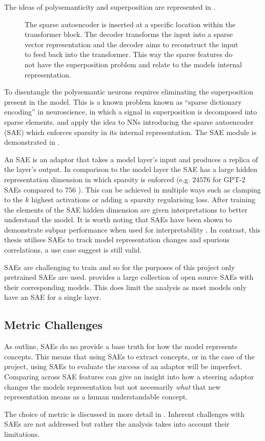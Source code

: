 The ideas of polysemanticity and superposition are represented in .

\begin{figure}
    \centering
    \captionsetup{width=.9\textwidth}
    
    \caption{The sparse autoencoder is inserted at a specific location within the transformer block. The decoder transforms the input into a sparse vector representation and the decoder aims to reconstruct the input to feed back into the transformer. This way the sparse features do not have the superposition problem and relate to the models internal representation.}
    \label{fig:sae}
\end{figure}

To disentangle the polysemantic neurons requires eliminating the superposition present in the model.
This is a known problem known as ``sparse dictionary encoding'' \citep{sparse-coding} in neuroscience, in which a signal in superposition is decomposed into sparse elements.
\citet{sae-orig} and \citet{saes} apply the idea to NNs introducing the sparse autoencoder (SAE) which enforces sparsity in its internal representation.
The SAE module is demonstrated in .

An SAE is an adaptor that takes a model layer's input and produces a replica of the layer's output.
In comparison to the model layer the SAE has a large hidden representation dimension in which sparsity is enforced (e.g. $24576$ for GPT-2 SAEs compared to $756$ \citep{saelens}).
This can be achieved in multiple ways such as clamping to the $k$ highest activations \citep{k-sparsity} or adding a sparsity regularising loss.
After training the elements of the SAE hidden dimension are given interpretations to better understand the model.
It is worth noting that SAEs have been shown to demonstrate subpar performance when used for interpretability \citep{saes-bad}.
In contrast, this thesis utilises SAEs to track model representation changes and spurious correlations, a use case \citet{saes-bad} suggest is still valid.

SAEs are challenging to train and so for the purposes of this project only pretrained SAEs are used.
\citet{saelens} provides a large collection of open source SAEs with their corresponding models.
This does limit the analysis as most models only have an SAE for a single layer.

\subsection{Metric Challenges}

As \citet{saes-bad} outline, SAEs do no provide a base truth for how the model represents concepts.
This means that using SAEs to extract concepts, or in the case of the project, using SAEs to evaluate the success of an adaptor will be imperfect.
Comparing across SAE features can give an insight into how a steering adaptor changes the models representation but not necessarily \emph{what} that new representation means as a human understandable concept.

The choice of metric is discussed in more detail in .
Inherent challenges with SAEs are not addressed but rather the analysis takes into account their limitations.
